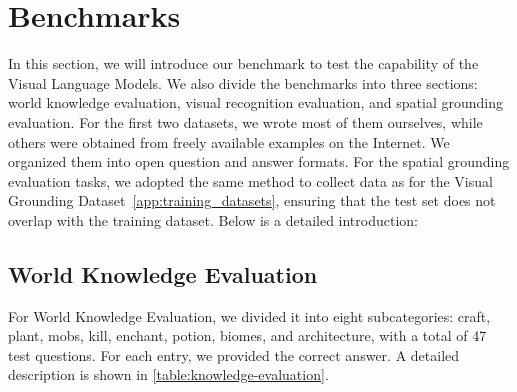 \section{Benchmarks}\label{app:benchmarks}

In this section, we will introduce our benchmark to test the capability of the Visual Language Models. We also divide the benchmarks into three sections: world knowledge evaluation, visual recognition evaluation, and spatial grounding evaluation. For the first two datasets, we wrote most of them ourselves, while others were obtained from freely available examples on the Internet. We organized them into open question and answer formats. For the spatial grounding evaluation tasks, we adopted the same method to collect data as for the Visual Grounding Dataset~\ref{app:training_datasets}, ensuring that the test set does not overlap with the training dataset. Below is a detailed introduction:

\subsection{World Knowledge Evaluation}

For World Knowledge Evaluation, we divided it into eight subcategories: craft, plant, mobs, kill, enchant, potion, biomes, and architecture, with a total of 47 test questions. For each entry, we provided the correct answer. A detailed description is shown in \autoref{table:knowledge-evaluation}.



